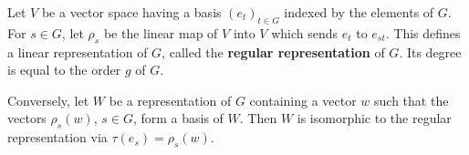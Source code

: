 Let $V$ be a vector space having a basis $(e_t)_{t \in G}$ indexed by the elements of $G$. For $s \in G$, let $\rho_s$ be the linear map of $V$ into $V$ which sends $e_t$ to $e_{st}$. This defines a linear representation of $G$, called the \textbf{regular representation} of $G$. Its degree is equal to the order $g$ of $G$.

Conversely, let $W$ be a representation of $G$ containing a vector $w$ such that the vectors $\rho_s(w)$, $s \in G$, form a basis of $W$. Then $W$ is isomorphic to the regular representation via $\tau(e_s) = \rho_s(w)$.
